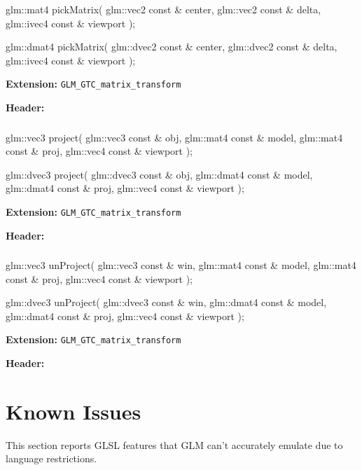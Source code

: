 \documentclass{scrartcl}
\numberwithin{figure}{subsection}
\begin{document}
\begin{cppcode}
glm::mat4 pickMatrix(
  glm::vec2 const & center, 
  glm::vec2 const & delta, 
  glm::ivec4 const & viewport
);

glm::dmat4 pickMatrix(
  glm::dvec2 const & center, 
  glm::dvec2 const & delta, 
  glm::ivec4 const & viewport
);
\end{cppcode}

\textbf{Extension:} \verb|GLM_GTC_matrix_transform|

\textbf{Header:} 

\subsubsection{}

\begin{cppcode}
glm::vec3 project(
  glm::vec3 const & obj,
  glm::mat4 const & model,
  glm::mat4 const & proj,
  glm::vec4 const & viewport
);

glm::dvec3 project(
  glm::dvec3 const & obj,
  glm::dmat4 const & model,
  glm::dmat4 const & proj,
  glm::vec4 const & viewport
);
\end{cppcode}

\textbf{Extension:} \verb|GLM_GTC_matrix_transform|

\textbf{Header:} 
 
\subsubsection{}

\begin{cppcode}
glm::vec3 unProject(
  glm::vec3 const & win, 
  glm::mat4 const & model, 
  glm::mat4 const & proj, 
  glm::vec4 const & viewport
);

glm::dvec3 unProject(
  glm::dvec3 const & win, 
  glm::dmat4 const & model, 
  glm::dmat4 const & proj, 
  glm::vec4 const & viewport
);
\end{cppcode}

\textbf{Extension:} \verb|GLM_GTC_matrix_transform|

\textbf{Header:} 

\newpage{}

\section{Known Issues}
This section reports GLSL features that GLM can't accurately emulate due to language restrictions.
\end{document}
